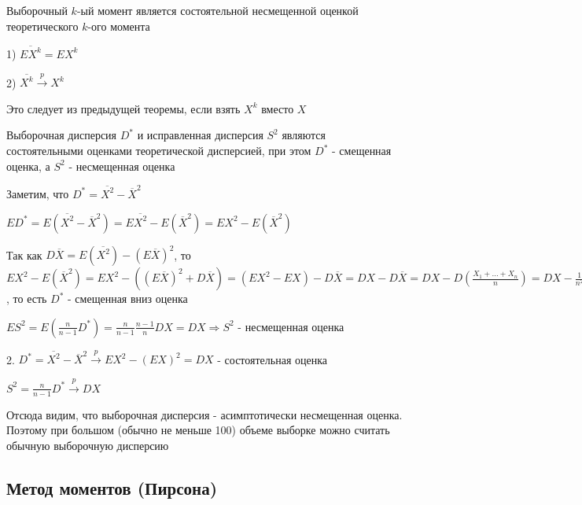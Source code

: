 \documentclass[12pt]{article}
\begin{document}
\begin{MyTheorem}
    \Ths Выборочный $k$-ый момент является состоятельной несмещенной оценкой теоретического $k$-ого момента

    1) $\overline{E X^k} = E X^k$

    2) $\overline{X^k} \overset{p}{\longrightarrow} X^k$
\end{MyTheorem}

Это следует из предыдущей теоремы, если взять $X^k$ вместо $X$

\begin{MyTheorem}
    \Ths Выборочная дисперсия $D^*$ и исправленная дисперсия $S^2$ являются состоятельными оценками теоретической дисперсией, при этом $D^*$ - смещенная оценка, а
    $S^2$ - несмещенная оценка
\end{MyTheorem}

\begin{MyProof}
    Заметим, что $D^* = \overline{X^2} - \overline{X}^2$

    $E D^* = E(\overline{X^2} - \overline{X}^2) = E\overline{X^2} - E (\overline{X}^2) = 
    E X^2 - E (\overline{X}^2)$

    Так как $D \overline{X} = E(\overline{X^2}) - (E \overline{X})^2$, то $E X^2 - E (\overline{X}^2) = 
    E X^2 - ((E\overline{X})^2 + D\overline{X}) = (E X^2 - EX) - D\overline{X} = D X - D \overline{X} = D X - D \left(\frac{X_1 + \dots + X_n}{n}\right) = 
    DX - \frac{1}{n^2} \sum_{i = 1}^n D X_i = DX - \frac{1}{n^2} n D X_1 = DX - \frac{1}{n} DX = \frac{n - 1}{n} DX$, то есть $D^*$ - смещенная вниз оценка

    $E S^2 = E(\frac{n}{n - 1} D^*) = \frac{n}{n - 1} \frac{n - 1}{n} DX = DX \Longrightarrow S^2$ - несмещенная оценка 

    2. $D^* = \overline{X^2} - \overline{X}^2 \overset{p}{\longrightarrow} E X^2 - (E X)^2 = DX$ - состоятельная оценка

    $S^2 = \frac{n}{n - 1} D^* \overset{p}{\longrightarrow} DX$
\end{MyProof}

\Nota Отсюда видим, что выборочная дисперсия - асимптотически несмещенная оценка. Поэтому при большом (обычно не меньше 100) объеме выборке можно
считать обычную выборочную дисперсию

\subsection{Метод моментов (Пирсона)}
\end{document}
